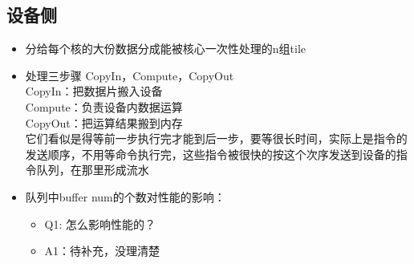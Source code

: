 \documentclass{article}
\begin{document}
	\subsection{设备侧}
	\begin{itemize}
	\item 分给每个核的大份数据分成能被核心一次性处理的n组tile
	\newpage		
		
	\item 处理三步骤 CopyIn，Compute，CopyOut\\
	CopyIn：把数据片搬入设备\\
	Compute：负责设备内数据运算\\
	CopyOut：把运算结果搬到内存\\
	它们看似是得等前一步执行完才能到后一步，要等很长时间，实际上是指令的发送顺序，不用等命令执行完，这些指令被很快的按这个次序发送到设备的指令队列，在那里形成流水
	\item 队列中buffer num的个数对性能的影响：
	\begin{itemize}
		\item Q1: 怎么影响性能的？
		\item A1：待补充，没理清楚
	\end{itemize}
    \end{itemize}
\end{document}
